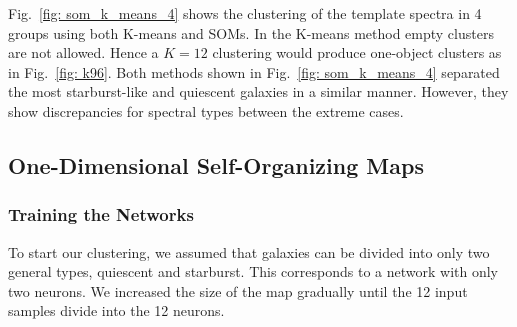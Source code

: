     Fig.~\ref{fig: som_k_means_4} shows the clustering of the template spectra in 4 groups using both K-means and SOMs.
        In the K-means method empty clusters are not allowed. 
        Hence a $K=12$ clustering would produce one-object clusters as in Fig.~\ref{fig: k96}.
        Both methods shown in Fig.~\ref{fig: som_k_means_4} separated the most starburst-like and quiescent galaxies in a similar manner.
        However, they show discrepancies for spectral types between the extreme cases.



    \subsection{One-Dimensional Self-Organizing Maps}
    \label{sec: 1D_somz}
        \subsubsection{Training the Networks}
        \label{sec: 1Dt}
            To start our clustering, we assumed that galaxies can be divided into only two general types, quiescent and starburst.
            This corresponds to a network with only two neurons.
            We increased the size of the map gradually until the 12 input samples divide into the 12 neurons. 
        
